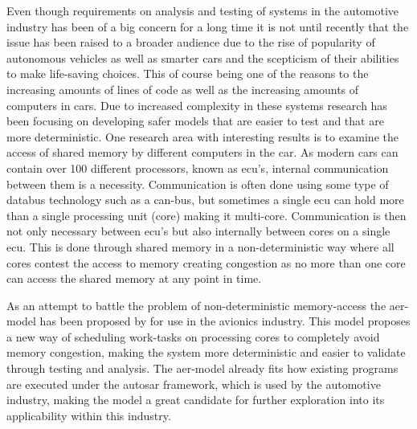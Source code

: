 \documentclass{kththesis}
\begin{document}
Even though requirements on analysis and testing of systems in the automotive industry has been of a
big concern for a long time it is not until recently that the issue has been raised to a broader
audience due to the rise of popularity of autonomous vehicles as well as smarter cars and the
scepticism of their abilities to make life-saving choices. This of course being one of the reasons
to the increasing amounts of lines of code as well as the increasing amounts of computers in cars.
Due to increased complexity in these systems research has been focusing on developing safer models
that are
easier to test and that are more deterministic. One research area with interesting results is to
examine the access
of shared memory by different computers in the car. As modern cars can contain over 100 different
processors, known as \acrfull{ecu}'s, internal communication between them is a necessity.
Communication is often done using some type of databus technology such as a \acrfull{can}-bus, but
sometimes a single \acrshort{ecu} can hold more than a single processing unit (core) making it
multi-core.  Communication is then not only necessary between \acrshort{ecu}'s but also internally
between cores on a single \acrshort{ecu}. This is done through shared memory in a non-deterministic
way where all cores contest the access to memory creating congestion as no more than one core can
access the shared memory at any point in time. 



As an attempt to battle the problem of non-deterministic memory-access the \acrshort{aer}-model has
been proposed by \textcite{durrieu_predictable_2014} for use in the avionics industry. This model
proposes a new way of scheduling work-tasks on processing cores to completely avoid memory
congestion, making the system more deterministic and easier to validate through testing and
analysis. The \acrshort{aer}-model already fits how existing programs are executed under the
\acrfull{autosar} framework, which is used by the automotive industry, making the model a great candidate for
further exploration into its applicability within this industry.

\end{document}
